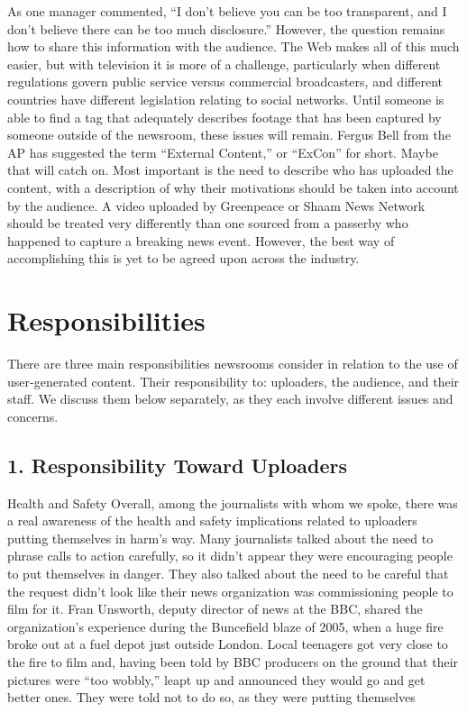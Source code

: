 \begin{enumerate}
As one manager commented, ``I don't believe you can be too transparent,
and I don't believe there can be too much disclosure.'' However, the question
remains how to share this information with the audience. The Web makes
all of this much easier, but with television it is more of a challenge, particularly
when different regulations govern public service versus commercial
broadcasters, and different countries have different legislation relating to
social networks. Until someone is able to find a tag that adequately describes
footage that has been captured by someone outside of the newsroom, these
issues will remain. Fergus Bell from the AP has suggested the term ``External
Content,'' or ``ExCon'' for short. Maybe that will catch on.
Most important is the need to describe who has uploaded the content, with
a description of why their motivations should be taken into account by the
audience. A video uploaded by Greenpeace or Shaam News Network should
be treated very differently than one sourced from a passerby who happened
to capture a breaking news event. However, the best way of accomplishing
this is yet to be agreed upon across the industry.

\chapter{Responsibilities}
There are three main responsibilities newsrooms consider in relation to the
use of user-generated content. Their responsibility to: uploaders, the audience,
and their staff. We discuss them below separately, as they each involve
different issues and concerns.
\section{1. Responsibility Toward Uploaders}
Health and Safety
Overall, among the journalists with whom we spoke, there was a real awareness
of the health and safety implications related to uploaders putting themselves
in harm's way. Many journalists talked about the need to phrase calls
to action carefully, so it didn't appear they were encouraging people to put
themselves in danger. They also talked about the need to be careful that the
request didn't look like their news organization was commissioning people
to film for it.
Fran Unsworth, deputy director of news at the BBC, shared the organization's
experience during the Buncefield blaze of 2005, when a huge fire broke
out at a fuel depot just outside London. Local teenagers got very close to the
fire to film and, having been told by BBC producers on the ground that their
pictures were ``too wobbly,'' leapt up and announced they would go and get
better ones. They were told not to do so, as they were putting themselves


\end{enumerate}
